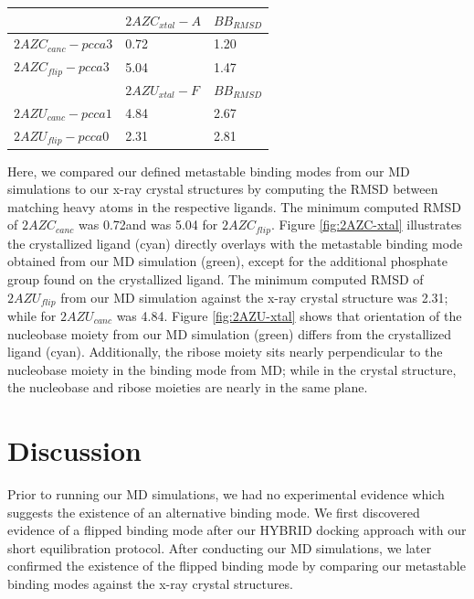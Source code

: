 \documentclass[fleqn,10pt]{wlscirep}
\newcommand{\angstrom}{\text{\normalfont\AA}}
\begin{document}
\begin{table}[!ht]
\begin{tabular}{|l|l|l|}
\hline
                          & \textbf{$2AZC_{xtal}-A$} & \textbf{$BB_{RMSD}$} \\ \hline
\textbf{$2AZC_{canc}-pcca3$} & 0.72                  & 1.20             \\ \hline
\textbf{$2AZC_{flip}-pcca3$} & 5.04                  & 1.47              \\ \hline
\textbf{}                 & \textbf{$2AZU_{xtal}-F$} & \textbf{$BB_{RMSD}$} \\ \hline
\textbf{$2AZU_{canc}-pcca1$} & 4.84                  & 2.67             \\ \hline
\textbf{$2AZU_{flip}-pcca0$} & 2.31                  & 2.81              \\ \hline
\end{tabular}
\end{table}

Here, we compared our defined metastable binding modes from our MD simulations to our x-ray crystal structures by computing the RMSD between matching heavy atoms in the respective ligands.
The minimum computed RMSD of $2AZC_{canc}$ was 0.72\angstrom and was 5.04 for $2AZC_{flip}$.
Figure \ref{fig:2AZC-xtal} illustrates the crystallized ligand (cyan) directly overlays with the metastable binding mode obtained from our MD simulation (green), except for the additional phosphate group found on the crystallized ligand.
The minimum computed RMSD of $2AZU_{flip}$ from our MD simulation against the x-ray crystal structure was 2.31\angstrom; while for $2AZU_{canc}$ was 4.84\angstrom.
Figure \ref{fig:2AZU-xtal} shows that orientation of the nucleobase moiety from our MD simulation (green) differs from the crystallized ligand (cyan).
Additionally, the ribose moiety sits nearly perpendicular to the nucleobase moiety in the binding mode from MD; while in the crystal structure, the nucleobase and ribose moieties are nearly in the same plane.

\section{Discussion}
Prior to running our MD simulations, we had no experimental evidence which suggests the existence of an alternative binding mode.
We first discovered evidence of a flipped binding mode after our HYBRID docking approach with our short equilibration protocol.
After conducting our MD simulations, we later confirmed the existence of the flipped binding mode by comparing our metastable binding modes against the x-ray crystal structures.
\end{document}
